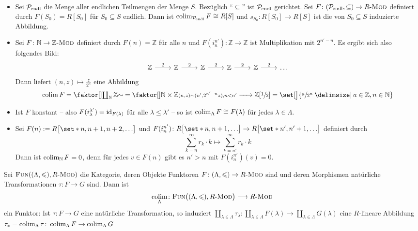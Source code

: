 \begin{beispiel}[{name=[Kolimiten]}]\leavevmode
	\begin{itemize}
		\item Sei $\mathcal{P}\mkern-2.5mu_{\mathrm{endl}}$ die Menge aller endlichen Teilmengen der Menge $S$. 
		Bezüglich \enquote{$\subseteq$} ist $\mathcal{P}\mkern-2.5mu_{\mathrm{endl}}$ gerichtet.
		Sei $F \colon \enbrace*{\mathcal{P}\mkern-2.5mu_{\mathrm{endl}},\subseteq} \to R\text{-}\MOD$ definiert durch $F(S_0)=R[S_0]$ für $S_0 \subseteq S$ endlich. 
		Dann ist $\colim_{\mathcal{P}\mkern-2.5mu_{\mathrm{endl}}} F \cong R[S]$ und $s_{S_0} \colon R[S_0]\to R[S]$ ist die von $S_0 \subseteq S$ induzierte Abbildung.
		\item Sei $F \colon \mathbb{N} \to \mathbb{Z}\text{-}\MOD$ definiert durch $F(n)=\mathbb{Z}$ für alle $n$ und $F(i_n^{n'}) \colon \mathbb{Z} \to \mathbb{Z}$ ist Multiplikation mit $2^{n'-n}$. 
		Es ergibt sich also folgendes Bild:
		\[
			\begin{tikzcd}
				\mathbb{Z} \rar["2"] & \mathbb{Z} \rar["2"] & \mathbb{Z} \rar["2"] &\mathbb{Z} \rar["2"] & \mathbb{Z} \rar["2"] & \ldots 
			\end{tikzcd}
		\]
		Dann liefert $(n,z) \mapsto \frac{z}{2^n}$ eine Abbildung
		\[
			\colim F = \Faktor{\coprod_{\mathbb{N}} \mathbb{Z}}{\sim} = \Faktor{\mathbb{N}\times \mathbb{Z}}{\scriptstyle(n,z) \sim (n',2^{n'-n} z), n < n'} \grenzw{} \mathbb{Z}\benbrace*{\sfrac{1}{2}} = \set[\big]{\sfrac{a}{2^n}\given a \in \mathbb{Z}, n \in \mathbb{N} }
		\]
		\item Ist $F$ konstant -- also $F(i_\lambda^{\lambda'})=\id_{F(\lambda)}$ für alle $\lambda \le \lambda'$ -- so ist 
		\(
			\colim_\Lambda F \cong F(\lambda)
		\)
		für jedes $\lambda \in \Lambda$.
		\item Sei $F(n) := R \benbrace[\big]{\set*{n,n+1,n+2,\ldots }}$ und $F(i_n^{n'}) \colon R \benbrace[\big]{\set*{n,n+1,\ldots }} \to R \benbrace[\big]{\set*{n',n'+1,\ldots }}$ definiert durch 
		\[
			\sum_{k=n}^{\infty} r_k \cdot k \longmapsto \sum_{k=n'}^{\infty} r_k \cdot k
		\]
		Dann ist $\colim_\mathbb{N} F = 0$, denn für jedes $v \in F(n)$ gibt es $n'> n$ mit $F(i_n^{n'})(v)=0$.
	\end{itemize}
\end{beispiel}

\begin{bemerkung}[{name=[gerichteter Limes als Funktor]}]
	Sei $\FUN\enbrace*{(\Lambda,\le), R\text{-}\MOD}$ die Kategorie, deren Objekte Funktoren $F \colon (\Lambda,\le) \to R \text{-}\MOD$ sind und deren Morphismen natürliche Transformationen $\tau \colon F \to G$ sind. Dann ist
	\[
		\colim_\Lambda \colon \FUN\enbrace[\big]{(\Lambda,\le), R\text{-}\MOD} \longrightarrow R\text{-}\MOD
	\]
	ein Funktor: Ist $\tau \colon F \to G$ eine natürliche Transformation, so induziert $\coprod_{\lambda \in \Lambda}\tau_\lambda \colon \coprod_{\lambda \in \Lambda} F(\lambda) \to \coprod_{\lambda \in \Lambda} G(\lambda)$ eine $R$-lineare Abbildung $\tau_* =\colim_\Lambda \tau \colon \colim_\Lambda F \to \colim_\Lambda G$
\end{bemerkung}

